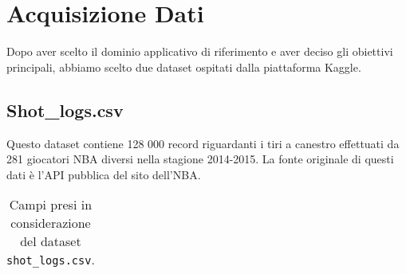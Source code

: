 \chapter{Acquisizione Dati}

Dopo aver scelto il dominio applicativo di riferimento e aver deciso gli obiettivi principali, abbiamo scelto due dataset ospitati dalla piattaforma Kaggle.

\section{Shot\_logs.csv}

Questo dataset contiene 128 000 record riguardanti i tiri a canestro effettuati da 281 giocatori NBA diversi nella stagione 2014-2015. La fonte originale di questi dati è l’API pubblica del sito dell’NBA.
\begin{center}
	\begin{longtable}[m]{|m{8em} m{7em} m{16em}|} 

		\caption{Campi presi in considerazione del dataset \texttt{shot\_logs.csv}.\label{long}}\\


\end{longtable}
\end{center}
